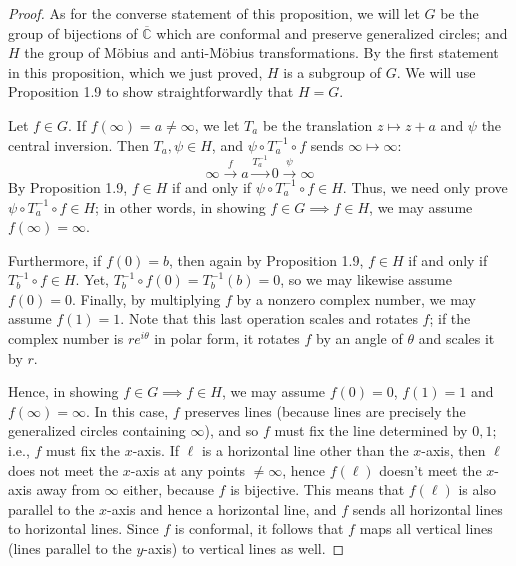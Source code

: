 \documentclass[leqno]{book}
\begin{document}
\begin{proof}
As for the converse statement of this proposition, we will let $G$ be the group of bijections of $\overline{\mathbb C}$ which are conformal and preserve generalized circles; and $H$ the group of M\"obius and anti-M\"obius transformations.  By the first statement in this proposition, which we just proved, $H$ is a subgroup of $G$.  We will use Proposition 1.9 to show straightforwardly that $H=G$.

Let $f\in G$.  If $f(\infty)=a\ne\infty$, we let $T_a$ be the translation $z\mapsto z+a$ and $\psi$ the central inversion.  Then $T_a,\psi\in H$, and $\psi\circ T_a^{-1}\circ f$ sends $\infty\mapsto\infty$:
$$\infty\overset{f}\longrightarrow a\overset{T_a^{-1}}\longrightarrow 0\overset{\psi}\longrightarrow\infty$$
By Proposition 1.9, $f\in H$ if and only if $\psi\circ T_a^{-1}\circ f\in H$.  Thus, we need only prove $\psi\circ T_a^{-1}\circ f\in H$; in other words, in showing $f\in G\implies f\in H$, we may assume $f(\infty)=\infty$.

Furthermore, if $f(0)=b$, then again by Proposition 1.9, $f\in H$ if and only if $T_b^{-1}\circ f\in H$.  Yet, $T_b^{-1}\circ f(0)=T_b^{-1}(b)=0$, so we may likewise assume $f(0)=0$.  Finally, by multiplying $f$ by a nonzero complex number, we may assume $f(1)=1$.  Note that this last operation scales and rotates $f$; if the complex number is $re^{i\theta}$ in polar form, it rotates $f$ by an angle of $\theta$ and scales it by $r$.

Hence, in showing $f\in G\implies f\in H$, we may assume $f(0)=0$, $f(1)=1$ and $f(\infty)=\infty$.  In this case, $f$ preserves lines (because lines are precisely the generalized circles containing $\infty$), and so $f$ must fix the line determined by $0,1$; i.e., $f$ must fix the $x$-axis.  If $\ell$ is a horizontal line other than the $x$-axis, then $\ell$ does not meet the $x$-axis at any points $\ne\infty$, hence $f(\ell)$ doesn't meet the $x$-axis away from $\infty$ either, because $f$ is bijective.  This means that $f(\ell)$ is also parallel to the $x$-axis and hence a horizontal line, and $f$ sends all horizontal lines to horizontal lines.  Since $f$ is conformal, it follows that $f$ maps all vertical lines (lines parallel to the $y$-axis) to vertical lines as well.


\end{proof}
\end{document}

